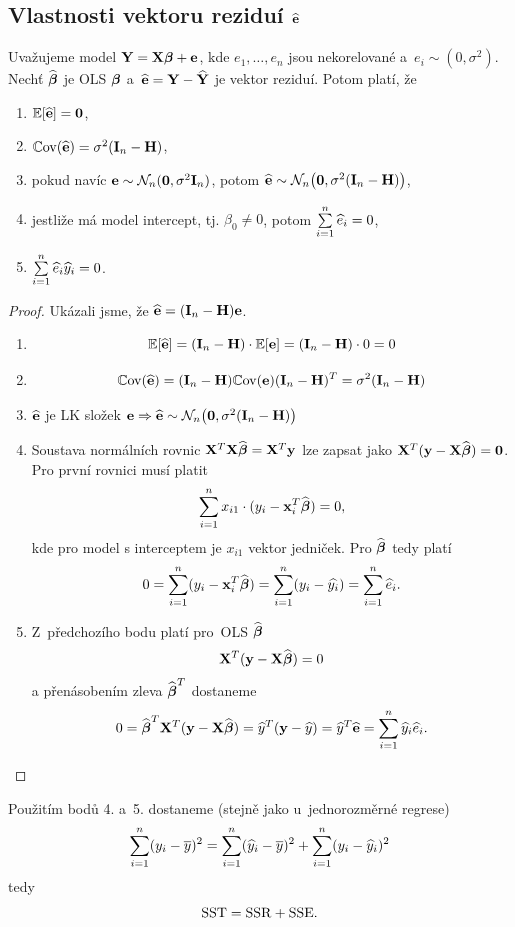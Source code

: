 \subsection{Vlastnosti vektoru reziduí $\heb$ }

\begin{theorem}
	Uvažujeme model $\Y = \X \betab + \eb$, kde $e_1,\dots, e_n$ jsou nekorelované a~$e_i \sim (0,\sigma^2)$. Nechť $\wbetab$ je OLS $\betab$ a~$\heb = \Y - \hYb$ je vektor reziduí. Potom platí, že

\begin{enumerate}
\item $\E [\heb] = \nula$,
\item $\Cov(\heb) = \sigma^2 (\In - \Hm)$,
\item pokud navíc $\eb \sim \NN_n (\nula, \sigma^2 \In)$, potom $\heb \sim \NN_n \big(\nula, \sigma^2 (\In - \Hm)\big)$,
\item jestliže má model intercept, tj. $\beta_0 \neq 0$, potom $\sumin \widehat{e}_i = 0$,
\item $\sumin \widehat{e}_i \widehat{y}_i = 0$.
\end{enumerate}		
\end{theorem}

\begin{proof}
Ukázali jsme, že $\heb = (\In - \Hm) \eb$.
\begin{enumerate}
\item $$\E [\heb] = (\In - \Hm) \cdot \E [\eb] = (\In - \Hm) \cdot 0 = 0$$
\item $$\Cov(\heb) = (\In - \Hm) \Cov(\eb) (\In - \Hm)^T = \sigma^2 (\In - \Hm)$$
\item $\heb$ je LK složek $\eb  \Rightarrow  \heb \sim \NN_n \big(\nula, \sigma^2 (\In - \Hm)\big)$
\item Soustava normálních rovnic $\X^T \X \wbetab = \X^T \y$ lze zapsat jako $\X^T (\y - \X \wbetab) = \nula$. Pro první rovnici musí platit
 $$
 \sumin x_{i1} \cdot (y_i - \x_i^T \wbetab) = 0,
 $$
kde pro model s interceptem je $x_{i1}$ vektor jedniček. Pro $\wbetab$ tedy platí
 $$
 0 = \sumin (y_i - \x_i^T \wbetab) = \sumin (y_i - \widehat{y_i}) = \sumin \he_i.
 $$
\item Z~předchozího bodu platí pro~OLS $\wbetab$
 $$
 \X^T (\y - \X \wbetab) = 0
 $$
a přenásobením zleva $\wbetab^T$ dostaneme
 $$
  0 = \wbetab^T \X^T (\y - \X \wbetab) = \widehat{y}^T (\y - \hy) = \hy^T \heb = \sumin \hy_i \he_i.
 $$
\end{enumerate}
\end{proof}
\begin{remark}
Použitím bodů 4. a~5. dostaneme (stejně jako u~jednorozměrné regrese)
$$
\sumin (y_i - \overline{y})^2 = \sumin (\widehat{y}_i - \overline{y})^2 + \sumin (y_i - \widehat{y}_i)^2
$$
tedy
$$
\SST = \SSR + \SSE.
$$
\end{remark}

